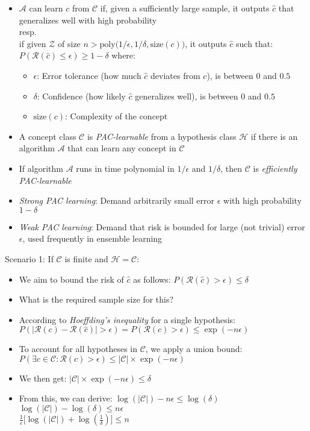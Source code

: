 \begin{itemize}
    \item $\mathcal{A}$ can learn $c$ from $\mathcal{C}$ if, given a sufficiently large sample, it outputs $\hat{c}$ that generalizes well with high probability\\
    resp.\\
    if given $\mathcal{Z}$ of size $n > \textrm{poly}\big(1/\epsilon, 1/\delta, \textrm{size}(c)\big)$, it outputs $\hat{c}$ such that:
    $
    P(\mathcal{R}(\hat{c}) \leq \epsilon) \geq 1 - \delta
    $
    where:
    \begin{itemize}
        \item $\epsilon$: Error tolerance (how much $\hat{c}$ deviates from $c$), is between $0$ and $0.5$
        \item $\delta$: Confidence (how likely $\hat{c}$ generalizes well), is between $0$ and $0.5$
        \item $\textrm{size}(c)$: Complexity of the concept
    \end{itemize}
    \item A concept class $\mathcal{C}$ is \emph{PAC-learnable} from a hypothesis class $\mathcal{H}$ if there is an algorithm $\mathcal{A}$ that can learn any concept in $\mathcal{C}$
    \item If algorithm $\mathcal{A}$ runs in time polynomial in $1/\epsilon$ and $1/\delta$, then $\mathcal{C}$ is \emph{efficiently PAC-learnable}
    \item \emph{Strong PAC learning}: Demand arbitrarily small error $\epsilon$ with high probability $1 - \delta$
    \item \emph{Weak PAC learning}: Demand that risk is bounded for large (not trivial) error $\epsilon$, used frequently in ensemble learning
\end{itemize}
Scenario 1: If $\mathcal{C}$ is finite and $\mathcal{H} = \mathcal{C}$:\\
\begin{itemize}
    \item We aim to bound the risk of $\hat{c}$ as follows:
    $
    P(\mathcal{R}(\hat{c}) > \epsilon) \leq \delta
    $
    \item What is the required sample size for this?
    \item According to \emph{Hoeffding's inequality} for a single hypothesis:
    $
    P(|\mathcal{R}(c) - \mathcal{R}(\hat{c})| > \epsilon) = P(\mathcal{R}(c) > \epsilon) \leq \exp(-n \epsilon)
    $
    \item To account for all hypotheses in $\mathcal{C}$, we apply a union bound:
    $
    P(\exists c \in \mathcal{C} : \mathcal{R}(c) > \epsilon) \leq |\mathcal{C}| \times \exp(-n \epsilon)
    $
    \item We then get:
    $
    |\mathcal{C}| \times \exp(-n \epsilon) \leq \delta
    $
    \item From this, we can derive:
    $
    \log(|\mathcal{C}|) - n \epsilon \leq \log(\delta)
    $\\
    $
    \log(|\mathcal{C}|) - \log(\delta) \leq n \epsilon
    $\\
    $
    \frac{1}{\epsilon} \big[\log(|\mathcal{C}|) + \log\left(\frac{1}{\delta}\right)\big] \leq n
    $
\end{itemize}
